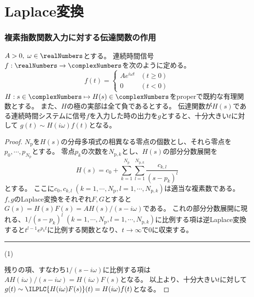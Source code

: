 \part{Laplace変換}
	\section{複素指数関数入力に対する伝達関数の作用}
		\begin{shadebox}
			$A>0,\;\omega \in \realNumbers$とする。
			連続時間信号$f: \realNumbers \to \complexNumbers$を次のように定める。
			\[
				f(t) =
				\begin{cases}
					Ae^{i\omega t} & (t\geq 0) \\
					0 & (t<0)
				\end{cases}
			\]
			$H: s\in\complexNumbers \mapsto H(s) \in \complexNumbers$をproperで既約な有理関数とする。
			また、$H$の極の実部は全て負であるとする。
			伝達関数が$H(s)$である連続時間システムに信号$f$を入力した時の出力を$g$とすると、十分大きい$t$に対して
			$g(t) \sim H(i\omega)f(t)$となる。
		\end{shadebox}
		\begin{proof}
			\quad\par
			$N_\text{p}$を$H(s)$の分母多項式の相異なる零点の個数とし、それら零点を$p_0,\cdots,p_{N_\text{p}}$とする。
			零点$p_k$の次数を$N_{\text{p},k}$とし、$H(s)$の部分分数展開を
			\[ H(s) = c_0 + \sum_{k=1}^{N_\mathrm{p}} \sum_{l=1}^{N_{\mathrm{p},k}} \frac{c_{k,l}}{(s-p_k)^l} \]
			とする。
			ここに$c_0,c_{k,l}\;(k=1,\cdots,N_\mathrm{p},l=1,\cdots,N_{\mathrm{p},k})$は適当な複素数である。
			$f,g$のLaplace変換をそれぞれ$F,G$とすると$G(s) = H(s)F(s) = A H(s)/(s-i\omega)$である。
			これの部分分数展開に現れる、$1/(s-p_k)^l\;(k=1,\cdots,N_\mathrm{p},l=1,\cdots,N_{\mathrm{p},k})$に比例する項は逆Laplace変換すると$t^{l-1}e^{p_k t}$に比例する関数となり、$t\to\infty$で0に収束する。\hfill \rule{10cm}{0.4pt}(1)
			\par
			残りの項、すなわち$1/(s-i\omega)$に比例する項は$AH(i\omega)/(s-i\omega) = H(i\omega)F(s)$となる。
			以上より、十分大きい$t$に対して$g(t) \sim \ILPLC{H(i\omega)F(s)}(t) = H(i\omega)f(t)$となる。
		\end{proof}
